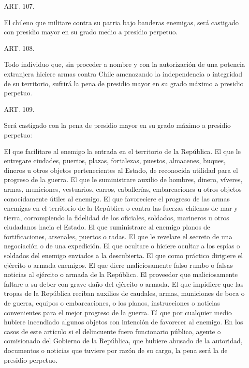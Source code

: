     ART. 107.

    El chileno que militare contra su patria bajo banderas enemigas, será castigado con presidio mayor en su grado medio a presidio perpetuo.



    ART. 108.

    Todo individuo que, sin proceder a nombre y con la autorización de una potencia extranjera hiciere armas contra Chile amenazando la independencia o integridad de su territorio, sufrirá la pena de presidio mayor en su grado máximo a presidio perpetuo.



    ART. 109.

    Será castigado con la pena de presidio mayor en su grado máximo a presidio perpetuo:

    El que facilitare al enemigo la entrada en el territorio de la República.
    El que le entregare ciudades, puertos, plazas, fortalezas, puestos, almacenes, buques, dineros u otros objetos pertenecientes al Estado, de reconocida utilidad para el progreso de la guerra.
    El que le suministrare auxilio de hombres, dinero, víveres, armas, municiones, vestuarios, carros, caballerías, embarcaciones u otros objetos conocidamente útiles al enemigo.
    El que favoreciere el progreso de las armas enemigas en el territorio de la República o contra las fuerzas chilenas de mar y tierra, corrompiendo la fidelidad de los oficiales, soldados, marineros u otros ciudadanos hacia el Estado.
    El que suministrare al enemigo planos de fortificaciones, arsenales, puertos o radas.
    El que le revelare el secreto de una negociación o de una expedición.
    El que ocultare o hiciere ocultar a los espías o soldados del enemigo enviados a la descubierta.
    El que como práctico dirigiere el ejército o armada enemigos.
    El que diere maliciosamente falso rumbo o falsas noticias al ejército o armada de la República.
    El proveedor que maliciosamente faltare a su deber con grave daño del ejército o armada.
    El que impidiere que las tropas de la República reciban auxilios de caudales, armas, municiones de boca o de guerra, equipos o embarcaciones, o los planos, instrucciones o noticias convenientes para el mejor progreso de la guerra.
    El que por cualquier medio hubiere incendiado algunos objetos con intención de favorecer al enemigo.
    En los casos de este artículo si el delincuente fuero funcionario público, agente o comisionado del Gobierno de la República, que hubiere abusado de la autoridad, documentos o noticias que tuviere por razón de su cargo, la pena será la de presidio perpetuo.





